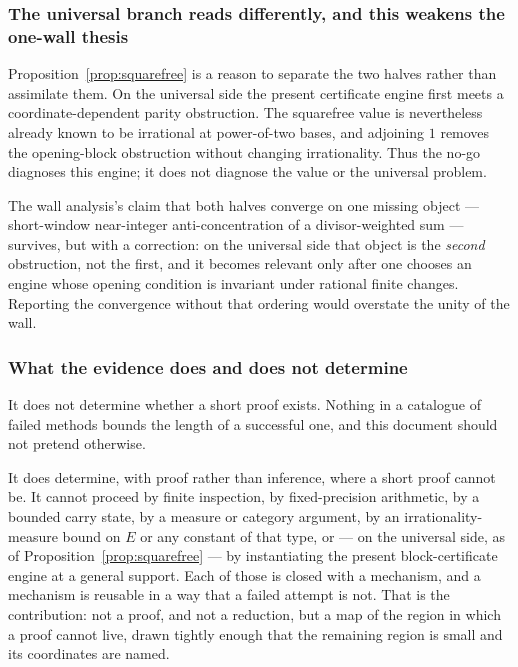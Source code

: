 \documentclass[11pt]{article}
\theoremstyle{plain}
\theoremstyle{definition}
\theoremstyle{remark}
\begin{document}
\subsubsection*{The universal branch reads differently, and this weakens the one-wall thesis}

Proposition~\ref{prop:squarefree} is a reason to separate the two halves
rather than assimilate them.  On the universal side the present
certificate engine first meets a coordinate-dependent parity obstruction.
The squarefree value is nevertheless already known to be irrational at
power-of-two bases, and adjoining $1$ removes the opening-block obstruction
without changing irrationality.  Thus the no-go diagnoses this engine; it
does not diagnose the value or the universal problem.

The wall analysis's claim that both halves converge on one missing object --- short-window
near-integer anti-concentration of a divisor-weighted sum --- survives, but with a correction: on
the universal side that object is the \emph{second} obstruction, not the first, and it becomes
relevant only after one chooses an engine whose opening condition is
invariant under rational finite changes. Reporting the convergence without
that ordering would overstate the unity of the wall.

\subsubsection*{What the evidence does and does not determine}

It does not determine whether a short proof exists. Nothing in a catalogue of failed methods
bounds the length of a successful one, and this document should not pretend otherwise.

It does determine, with proof rather than inference, where a short proof cannot be. It cannot
proceed by finite inspection, by fixed-precision arithmetic, by a bounded carry state, by a
measure or category argument, by an irrationality-measure bound on $E$ or any constant of that
type, or --- on the universal side, as of Proposition~\ref{prop:squarefree} --- by instantiating
the present block-certificate engine at a general support. Each of those is closed with a
mechanism, and a mechanism is reusable in a way that a failed attempt is not. That is the
contribution: not a proof, and not a reduction, but a map of the region in which a proof cannot
live, drawn tightly enough that the remaining region is small and its coordinates are named.
\end{document}
